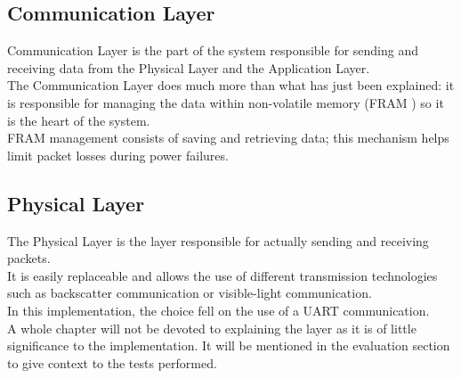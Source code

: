 \subsection{Communication Layer}
Communication Layer is the part of the system responsible for sending and receiving data from the Physical Layer and the Application Layer.\\
The Communication Layer does much more than what has just been explained: it is responsible for managing the data within non-volatile memory (FRAM \cite{FRAM})  so it is the heart of the system.\\
FRAM management consists of saving and retrieving data; this mechanism helps limit packet losses during power failures.\\
\subsection{Physical Layer}
The Physical Layer is the layer responsible for actually sending and receiving packets.\\
It is easily replaceable and allows the use of different transmission technologies such as backscatter communication or visible-light communication.\\
In this implementation, the choice fell on the use of a UART communication.\\
A whole chapter will not be devoted to explaining the layer as it is of little significance to the implementation. It will be mentioned in the evaluation section to give context to the tests performed.
  
\newpage




